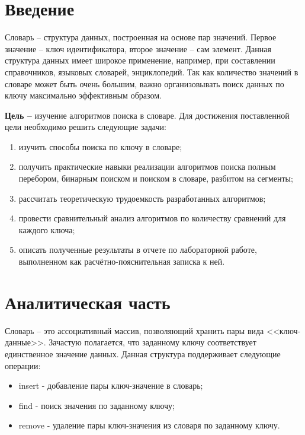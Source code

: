 \documentclass[a4paper,oneside,14pt]{extreport}
\begin{document}

\newpage
\tableofcontents
{}

\newpage

\chapter*{Введение}
Словарь -- структура данных, построенная на основе пар значений. Первое значение -- ключ идентификатора, второе значение -- сам элемент. Данная структура данных имеет широкое применение, например, при составлении справочников, языковых словарей, энциклопедий. Так как количество значений в словаре может быть очень большим, важно организовывать поиск данных по ключу максимально эффективным образом.

\textbf{Цель --} изучение алгоритмов поиска в словаре.
Для достижения поставленной цели необходимо решить следующие задачи:
\begin{enumerate}
	\item изучить способы поиска по ключу в словаре;
	\item получить практические навыки реализации алгоритмов поиска полным перебором, бинарным поиском и поиском в словаре, разбитом на сегменты;
	\item рассчитать теоретическую трудоемкость разработанных алгоритмов;
	\item провести сравнительный анализ алгоритмов по количеству сравнений для каждого ключа;
	\item описать полученные результаты в отчете по лабораторной работе, выполненном как расчётно-пояснительная записка к ней.
\end{enumerate}
\newpage

\chapter{Аналитическая часть}

Словарь -- это ассоциативный массив, позволяющий хранить пары вида <<ключ-данные>>. Зачастую полагается, что заданному ключу соответствует единственное значение данных. Данная структура  поддерживает следующие операции:
\begin{itemize}
	\item insert - добавление пары ключ-значение в словарь;
	\item find - поиск значения по заданному ключу;
	\item remove - удаление пары ключ-значения из словаря по заданному ключу.
\end{itemize}
\end{document}
